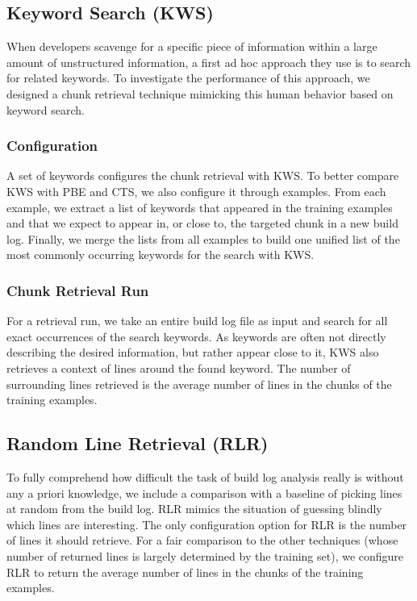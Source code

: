 \subsection{Keyword Search (KWS)}
When developers scavenge for a specific piece of information within a
large amount of unstructured information, a first ad hoc approach they
use is to search for related keywords.
To investigate the performance of this approach, we designed a chunk
retrieval technique mimicking this human behavior based on keyword
search.

\subsubsection{Configuration}
A set of keywords configures the chunk retrieval with KWS\@.
To better
compare KWS with PBE and CTS, we also configure it through examples.
From each example, we extract a list of keywords that appeared in the
training examples and that we expect to appear
in, or close to, the targeted chunk in a new build log.
Finally, we merge the lists from all examples to build one unified
list of the most commonly occurring keywords for the search with KWS.

\subsubsection{Chunk Retrieval Run}
For a retrieval run, we take an entire build log file as input and
search for all exact occurrences of the search keywords.
As keywords are
often not directly describing the desired information, but rather
appear close to it, KWS also retrieves a context of lines
around the found keyword.
The number of surrounding lines retrieved is
the average number of lines in the chunks of the training examples.

\subsection{Random Line Retrieval (RLR)}
\label{sec:expl-rlr}
To fully comprehend how difficult the task of build log analysis really
is without any a priori knowledge, we include a comparison with a
baseline of
picking lines at random from the build log.
RLR mimics the
situation of guessing blindly which lines are interesting.
The only configuration option for RLR is the number of lines it should
retrieve.
For a fair comparison to the other techniques (whose number of
returned lines is largely determined by the training set),
we configure RLR to return the average
number of lines in the chunks of the training examples.

